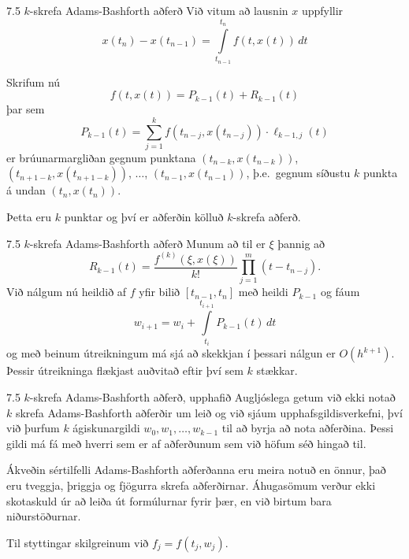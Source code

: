 \begin{frame}{7.5 $k$-skrefa  Adams-Bashforth aðferð} 
Við vitum að lausnin $x$ uppfyllir
\begin{equation*}
  x(t_{n}) - x(t_{n-1}) = 
  \int\limits_{t_{n-1}}^{t_n} f(t,x(t)) \, dt 
\end{equation*}

\pause
Skrifum nú
\begin{equation*}
  f(t,x(t)) = P_{k-1}(t) + R_{k-1}(t)
\end{equation*}
þar sem
\begin{equation*}
  P_{k-1}(t) = \sum\limits_{j=1}^k f(t_{n-j},x(t_{n-j})) \cdot
  \ell_{k-1,j}(t)
\end{equation*}
er brúunarmargliðan gegnum punktana $(t_{n-k},x(t_{n-k}))$,
$(t_{n+1-k},x(t_{n+1-k}))$, $\ldots$, $(t_{n-1},x(t_{n-1}))$,
þ.e.~gegnum síðustu $k$ punkta á undan $(t_n,x(t_n))$. 

Þetta eru $k$ punktar og því er aðferðin kölluð $k$-skrefa
aðferð. 
\end{frame}


\begin{frame}{7.5 $k$-skrefa  Adams-Bashforth aðferð} 
Munum að til er  $\xi$ þannig að 
\begin{equation*}
  R_{k-1}(t) = \frac{f^{(k)}(\xi,x(\xi))}{k!}
  \prod\limits_{j=1}^m (t-t_{n-j}).
\end{equation*}
Við nálgum nú heildið af $f$ yfir bilið 
$[t_{n-1},t_n]$ með heildi $P_{k-1}$ og fáum
\begin{equation*}
  w_{i+1} = w_i +
  \int\limits_{t_i}^{t_{i+1}} P_{k-1}(t) \, dt
\end{equation*}
og með beinum  útreikningum má sjá að skekkjan í þessari nálgun er 
$O(h^{k+1})$.  Þessir útreikninga flækjast auðvitað eftir því sem 
$k$ stækkar.
\end{frame}


\begin{frame}{7.5 $k$-skrefa  Adams-Bashforth aðferð, upphafið} 
Augljóslega getum við ekki notað $k$ skrefa Adams-Bashforth aðferðir
um leið og við sjáum upphafsgildisverkefni, því við þurfum $k$
ágiskunargildi $w_0, w_1, \ldots, w_{k-1}$ til að byrja að nota
aðferðina. Þessi gildi má fá með hverri sem er af aðferðunum sem við
höfum séð hingað til. 

\pause
\smallskip
Ákveðin sértilfelli Adams-Bashforth aðferðanna eru meira notuð en
önnur, það eru tveggja, þriggja og fjögurra skrefa
aðferðirnar. Áhugasömum verður ekki skotaskuld úr að leiða út
formúlurnar fyrir þær, en við birtum bara niðurstöðurnar. 

\pause
\smallskip
Til styttingar skilgreinum við  $f_j = f(t_j,w_j)$.
\end{frame}


